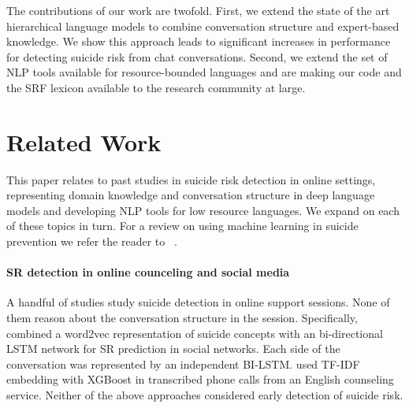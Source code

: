 \documentclass[letterpaper]{article} %
\begin{document}
The contributions of our work are twofold. First, we extend the state of the art hierarchical language models to combine conversation structure and expert-based knowledge. We show  this approach leads to significant increases in performance for detecting suicide risk from chat conversations.  Second, we extend the set of NLP tools available for resource-bounded languages and are making our code and the  SRF lexicon available to the research community at large.


\section{Related Work}


This paper relates to past studies in  suicide risk detection in online settings,  representing domain knowledge and conversation structure in deep
language models and developing NLP tools for low resource languages. We expand on each of these topics in turn.  For a review on using machine learning in suicide prevention we  refer the reader to ~\citet{jiSuicidalIdeationDetection2021}.

\paragraph{SR detection in online counceling and social media}
A  handful of studies study suicide detection in online support sessions. None of them reason about  the conversation structure in the session.
Specifically,
\citet{xuDetectingSuicideRisk2021} combined
 a word2vec representation of suicide concepts with an bi-directional LSTM network for SR prediction in social networks. Each side of the conversation was represented by an independent BI-LSTM.
\citet{bantilanJustTimeCrisis2021} used TF-IDF embedding with  XGBoost  in transcribed phone calls from an English counseling service.  Neither of the above approaches considered early detection of suicide risk.
\end{document}
